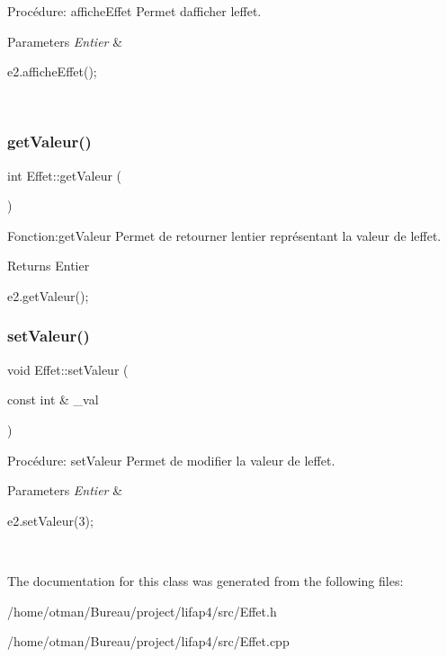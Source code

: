 Procédure\+: affiche\+Effet Permet d\textquotesingle{}afficher l\textquotesingle{}effet. 


\begin{DoxyParams}{Parameters}
{\em Entier} & 
\begin{DoxyCode}
e2.afficheEffet();
\end{DoxyCode}
 \\
\hline
\end{DoxyParams}
\mbox{\label{classEffet_ab47e7ca4baed53d6955ad59a41d79538}} 
\subsubsection{\texorpdfstring{get\+Valeur()}{getValeur()}}
{\footnotesize\ttfamily int Effet\+::get\+Valeur (\begin{DoxyParamCaption}{ }\end{DoxyParamCaption})}



Fonction\+:get\+Valeur Permet de retourner l\textquotesingle{}entier représentant la valeur de l\textquotesingle{}effet. 

\begin{DoxyReturn}{Returns}
Entier 
\begin{DoxyCode}
e2.getValeur();
\end{DoxyCode}
 
\end{DoxyReturn}
\mbox{\label{classEffet_a3d22eeba4c86d9f45e75d64e639d4e37}} 
\subsubsection{\texorpdfstring{set\+Valeur()}{setValeur()}}
{\footnotesize\ttfamily void Effet\+::set\+Valeur (\begin{DoxyParamCaption}\item[{const int \&}]{\+\_\+val }\end{DoxyParamCaption})}



Procédure\+: set\+Valeur Permet de modifier la valeur de l\textquotesingle{}effet. 


\begin{DoxyParams}{Parameters}
{\em Entier} & 
\begin{DoxyCode}
e2.setValeur(3);
\end{DoxyCode}
 \\
\hline
\end{DoxyParams}


The documentation for this class was generated from the following files\+:\begin{DoxyCompactItemize}
\item 
/home/otman/\+Bureau/project/lifap4/src/Effet.\+h\item 
/home/otman/\+Bureau/project/lifap4/src/Effet.\+cpp\end{DoxyCompactItemize}
